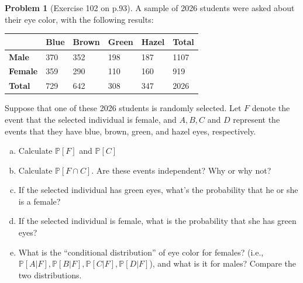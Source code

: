 \documentclass[10pt]{article}
\theoremstyle{definition}
\newtheorem{problem}[theorem]{Problem}
\newcommand{\1}[1]{\textbf{1}_{\left[#1\right]}} %
\def\P{\mathbb{P}} %
\begin{document}
\begin{problem}[Exercise 102 on p.93]
  A sample of 2026 students were asked about their eye color, with the
  following results:

  \begin{center}
    \begin{tabular}{|l|lllll|}
      \hline
      & \multicolumn{1}{l|}{\textbf{Blue}} & \multicolumn{1}{l|}{\textbf{Brown}} & \multicolumn{1}{l|}{\textbf{Green}} & \multicolumn{1}{l|}{\textbf{Hazel}} & \textbf{Total} \\ \hline
      \textbf{Male}   & \multicolumn{1}{l|}{370}           & \multicolumn{1}{l|}{352}            & \multicolumn{1}{l|}{198}            & \multicolumn{1}{l|}{187}            & 1107           \\ \hline
      \textbf{Female} & \multicolumn{1}{l|}{359}           & \multicolumn{1}{l|}{290}            & \multicolumn{1}{l|}{110}            & \multicolumn{1}{l|}{160}            & 919            \\ \hline
      \textbf{Total}  & \multicolumn{1}{l|}{729}           & \multicolumn{1}{l|}{642}            & \multicolumn{1}{l|}{308}            & \multicolumn{1}{l|}{347}            & 2026           \\ \hline
    \end{tabular}
  \end{center}

  Suppose that one of these 2026 students is randomly selected. Let $F$ denote the event that the
  selected individual is female, and $A,B,C$ and $D$ represent the events that they have blue, brown,
  green, and hazel eyes, respectively.
  \begin{enumerate}[(a)]
    \item Calculate $\P\left[F \right]$ and $\P\left[C \right]$
    \item Calculate $\P\left[F\cap C \right]$. Are these events independent? Why or why not?
    \item If the selected individual has green eyes, what's the probability that he or she is a female?
    \item If the selected individual is female, what is the probability that she has green eyes?
    \item What is the ``conditional distribution'' of eye color for females? (i.e., $\P\left[A|F
    \right], \P\left[B|F \right], \P\left[C|F \right], \P\left[D|F \right]$), and what is it for males?
    Compare the two distributions.
  \end{enumerate}
\end{problem}
\end{document}
